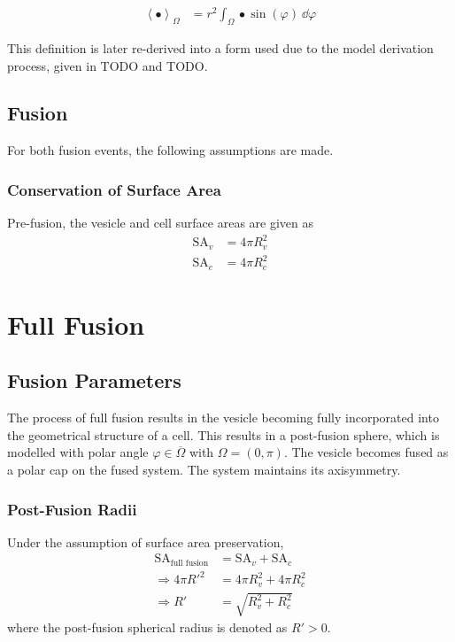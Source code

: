 \documentclass{report}
\newcommand\Angle[1]{{ \left\langle{#1}\right\rangle }}
\newcommand\R{{ R' }}
\newcommand\SA{{ \text{SA} }}
\begin{document}
\begin{align*}
	\Angle{\bullet}_\Omega &= r^2 \int_\Omega \bullet \sin(\varphi)\ \dd\varphi
\end{align*}

This definition is later re-derived into a form used due to the model derivation process, given in TODO and TODO.

\section{Fusion}

For both fusion events, the following assumptions are made.

\subsection{Conservation of Surface Area}
Pre-fusion, the vesicle and cell surface areas are given as
\begin{align*}
	\SA_v &= 4\pi R_v^2 \\
	\SA_c &= 4\pi R_c^2
\end{align*}

\chapter{Full Fusion}
\section{Fusion Parameters}
The process of full fusion results in the vesicle becoming fully incorporated into the geometrical structure of a cell. This results in a post-fusion sphere, which is modelled with polar angle $\varphi \in \overline\Omega$ with $\Omega = (0, \pi)$. The vesicle becomes fused as a polar cap on the fused system. The system maintains its axisymmetry.

\subsection{Post-Fusion Radii}
Under the assumption of surface area preservation,
\begin{align*}
	\SA_\text{full fusion} &= \SA_v + \SA_c \\
	\Rightarrow 4\pi \R^2 &= 4\pi R_v^2 + 4\pi R_c^2 \\
	\Rightarrow \R &= \sqrt{R_v^2 + R_c^2}
\end{align*}
where the post-fusion spherical radius is denoted as $\R > 0$.
\end{document}
